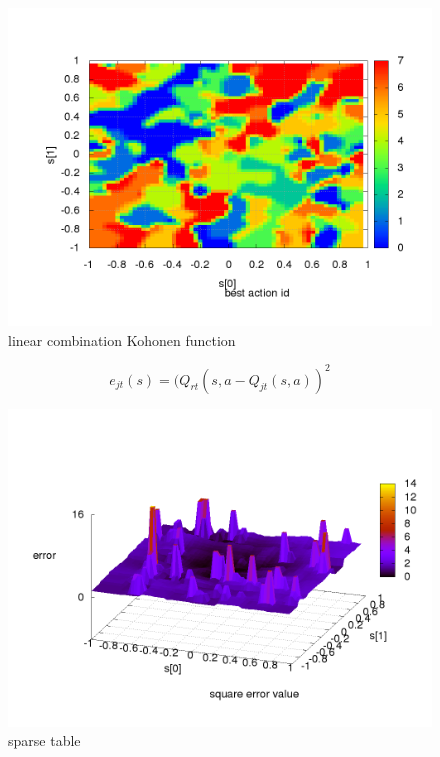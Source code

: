 \begin{figure}[!htb]
\includegraphics[scale=.4]{../../results_q_learning/map_1/function_type_4/iterations_10/action_best_value_log_surface.png}
\caption{linear combination Kohonen function}
\end{figure}




\begin{equation}
e_{jt}(s) = (Q_{rt}(s,a - Q_{jt}(s,a))^2  \nonumber
\end{equation}


\begin{figure}[!htb]
\centering
\includegraphics[scale=.4]{../../results_q_learning/map_1/function_type_1/q_learning_error.png}
\caption{sparse table}
\end{figure}


